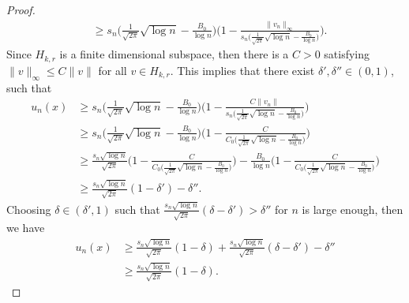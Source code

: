 \documentclass[11pt]{amsart}
\numberwithin{equation}{section}
\newcommand{\1}{\frac{1}{2}}
\begin{document}
\begin{proof}
\begin{align*}
			& \geq s_n \Big( \frac{1}{\sqrt{2\pi}}\sqrt{\log{n}} - \frac{B_0}{\log{n}}\Big) \Bigg( 1- \frac{ \|v_n\|_\infty}{s_n\Big(\frac{1}{\sqrt{2\pi}}\sqrt{\log{n}}- \frac{B_0}{\log{n}}\Big)} \Bigg).
		\end{align*}
		Since $H_{k,r}$ is a finite dimensional subspace, then there is a $C>0$ satisfying $\|v\|_\infty \leq C \|v\|$ for all $v\in H_{k,r}$. This implies that there exist $\delta', \delta'' \in (0,1)$, such that 
		\begin{align*}
			u_n(x)& \geq s_n \Big( \frac{1}{\sqrt{2\pi}}\sqrt{\log{n}} - \frac{B_0}{\log{n}}\Big)\Bigg( 1- \frac{ C\|v_n\|}{s_n\Big(\frac{1}{\sqrt{2\pi}}\sqrt{\log{n}}- \frac{B_0}{\log{n}}\Big)} \Bigg)\\
			& \geq s_n \Big( \frac{1}{\sqrt{2\pi}}\sqrt{\log{n}} - \frac{B_0}{\log{n}}\Big) \Bigg( 1- \frac{ C}{C_0\Big(\frac{1}{\sqrt{2\pi}}\sqrt{\log{n}}- \frac{B_0}{\log{n}}\Big)} \Bigg)\\
			& \geq \frac{s_n \sqrt{\log{n}}}{\sqrt{2\pi}} \Bigg( 1- \frac{ C}{C_0\Big(\frac{1}{\sqrt{2\pi}}\sqrt{\log{n}}- \frac{B_0}{\log{n}}\Big)} \Bigg)- \frac{B_0}{\log{n}} \Bigg( 1- \frac{ C}{C_0\Big(\frac{1}{\sqrt{2\pi}}\sqrt{\log{n}}- \frac{B_0}{\log{n}}\Big)} \Bigg)\\
			& \geq \frac{s_n \sqrt{\log{n}}}{\sqrt{2\pi}} (1-\delta') - \delta''.
		\end{align*}
		Choosing $ \delta \in (\delta', 1)$ such that $\frac{s_n \sqrt{\log{n}}}{\sqrt{2\pi}} (\delta-\delta') > \delta''$ for $n$ is large enough, then we have
		\begin{align*}
			u_n(x) &\geq \frac{s_n \sqrt{\log{n}}}{\sqrt{2\pi}} (1-\delta) + \frac{s_n \sqrt{\log{n}}}{\sqrt{2\pi}} (\delta-\delta') - \delta''\\
			& \geq \frac{s_n \sqrt{\log{n}}}{\sqrt{2\pi}} (1-\delta).
		\end{align*}
		

\end{proof}
\end{document}
